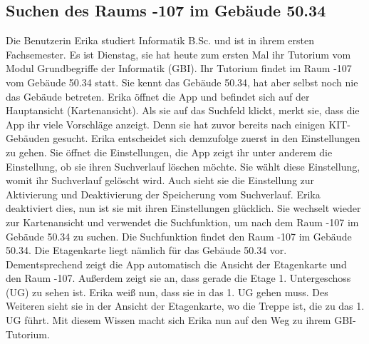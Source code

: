 \subsection{Suchen des Raums -107 im Gebäude 50.34}

Die Benutzerin Erika studiert Informatik B.Sc. und ist in ihrem ersten Fachsemester.
Es ist Dienstag, sie hat heute zum ersten Mal ihr Tutorium vom Modul Grundbegriffe der Informatik (GBI).
Ihr Tutorium findet im Raum -107 vom Gebäude 50.34 statt.
Sie kennt das Gebäude 50.34, hat aber selbst noch nie das Gebäude betreten.
Erika öffnet die App und befindet sich auf der Hauptansicht (Kartenansicht).
Als sie auf das Suchfeld klickt, merkt sie, dass die App ihr viele Vorschläge anzeigt.
Denn sie hat zuvor bereits nach einigen KIT-Gebäuden gesucht.
Erika entscheidet sich demzufolge zuerst in den Einstellungen zu gehen.
Sie öffnet die Einstellungen, die App zeigt ihr unter anderem die Einstellung, ob sie ihren Suchverlauf löschen möchte.
Sie wählt diese Einstellung, womit ihr Suchverlauf gelöscht wird.
Auch sieht sie die Einstellung zur Aktivierung und Deaktivierung der Speicherung vom Suchverlauf.
Erika deaktiviert dies, nun ist sie mit ihren Einstellungen glücklich.
Sie wechselt wieder zur Kartenansicht und verwendet die Suchfunktion, um nach dem Raum -107 im Gebäude 50.34 zu suchen.
Die Suchfunktion findet den Raum -107 im Gebäude 50.34.
Die Etagenkarte liegt nämlich für das Gebäude 50.34 vor.
Dementsprechend zeigt die App automatisch die Ansicht der Etagenkarte und den Raum -107.
Außerdem zeigt sie an, dass gerade die Etage 1. Untergeschoss (UG) zu sehen ist.
Erika weiß nun, dass sie in das 1. UG gehen muss.
Des Weiteren sieht sie in der Ansicht der Etagenkarte, wo die Treppe ist, die zu das 1. UG führt.
Mit diesem Wissen macht sich Erika nun auf den Weg zu ihrem GBI-Tutorium.